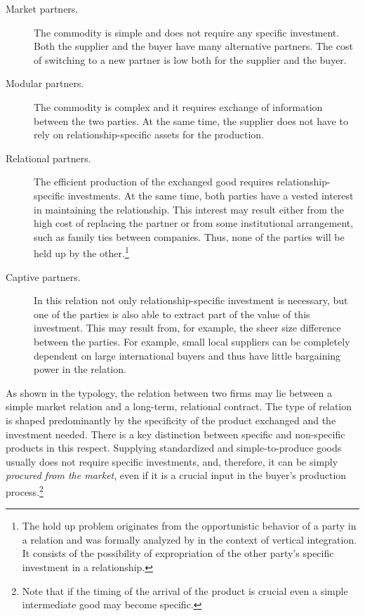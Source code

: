 \documentclass[final, dvipsnames, authoryear,12pt]{elsarticle}
\begin{document}
\begin{description}
    \item[Market partners.] The commodity is simple and does not require any specific investment. Both the supplier and the buyer have many alternative partners. The cost of switching to a new partner is low both for the supplier and the buyer.
    \item[Modular partners.] The commodity is complex and it requires exchange of information between the two parties. At the same time, the supplier does not have to rely on relationship-specific assets for the production.
    \item[Relational partners.] The efficient production of the exchanged good requires relationship-specific investments. At the same time, both parties have a vested interest in maintaining the relationship. This interest may result either from the high cost of replacing the partner or from some institutional arrangement, such as family ties between companies. Thus, none of the parties will be held up by the other.\footnote{The hold up problem originates from the opportunistic behavior of a party in a relation \citep{williamson2007economic} and was formally analyzed by \cite{grossman1986costs} in the context of vertical integration. It consists of the possibility of expropriation of the other party's specific investment in a relationship.}
    \item[Captive partners.] In this relation not only relationship-specific investment is necessary, but one of the parties is also able to extract part of the value of this investment. This may result from, for example, the sheer size difference between the parties. For example, small local suppliers can be completely dependent on large international buyers and thus have little bargaining power in the relation.
\end{description}

As shown in the typology, the relation between two firms may lie between a simple market relation and a long-term, relational contract. The type of relation is shaped predominantly by the specificity of the product exchanged and the investment needed. There is a key distinction between specific and non-specific products in this respect. Supplying standardized and simple-to-produce goods usually does not require specific investments, and, therefore, it can be simply \textit{procured from the market}, even if it is a crucial input in the buyer's production process.\footnote{Note that if the timing of the arrival of the product is crucial even a simple intermediate good may become specific.} 
\end{document}
